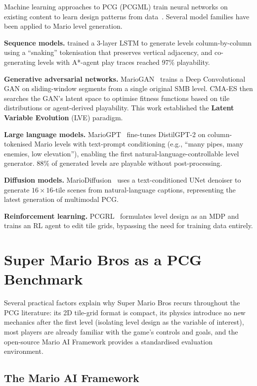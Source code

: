 \documentclass[shortabstract, mgr, english]{iithesis}
\begin{document}
Machine learning approaches to PCG (PCGML) train neural networks on existing
content to learn design patterns from data~\citep{summerville2018pcgml}. Several
model families have been applied to Mario level generation.

\textbf{Sequence models.} \citet{summerville2016super} trained a 3-layer LSTM to
generate levels column-by-column using a ``snaking'' tokenisation that preserves
vertical adjacency, and co-generating levels with A*-agent play traces reached
97\% playability.

\textbf{Generative adversarial networks.} MarioGAN~\citep{volz2018evolving}
trains a Deep Convolutional GAN on sliding-window segments from a single
original SMB level. CMA-ES then searches the GAN's latent space to optimise
fitness functions based on tile distributions or agent-derived playability. This
work established the \textbf{Latent Variable Evolution} (LVE) paradigm.

\textbf{Large language models.} MarioGPT~\citep{sudhakaran2023mariogpt}
fine-tunes DistilGPT-2 on column-tokenised Mario levels with text-prompt
conditioning (e.g., ``many pipes, many enemies, low elevation''), enabling the
first natural-language-controllable level generator. 88\% of generated levels
are playable without post-processing.

\textbf{Diffusion models.} MarioDiffusion~\citep{schrum2025mariodiffusion} uses a
text-conditioned UNet denoiser to generate $16 \times 16$-tile scenes from
natural-language captions, representing the latest generation of multimodal PCG.

\textbf{Reinforcement learning.} PCGRL~\citep{khalifa2020pcgrl} formulates level
design as an MDP and trains an RL agent to edit tile grids, bypassing the need
for training data entirely.


\section{Super Mario Bros as a PCG Benchmark}
\label{sec:bg-mario}

Several practical factors explain why Super Mario Bros recurs throughout the
PCG literature: its 2D tile-grid format is compact, its
physics introduce no new mechanics after the first level (isolating level design
as the variable of interest), most players are already familiar
with the game's controls and goals, and the open-source Mario AI Framework
provides a standardised evaluation environment.

\subsection{The Mario AI Framework}
\label{subsec:bg-mario-framework}
\end{document}
